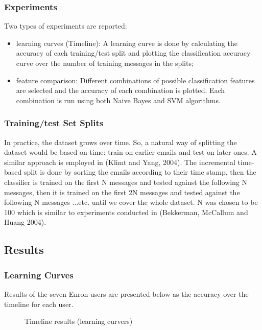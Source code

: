 \subsubsection{Experiments}
Two types of experiments are reported:

\begin{itemize}
  \item learning curves (Timeline): A learning curve is done by calculating the 
  accuracy of each training/test split and plotting the classification accuracy 
  curve over the number of training messages in the splits;

  \item feature comparison: Different combinations of possible classification 
  features are selected and the accuracy of each combination is plotted. 
  Each combination is run using both Naive Bayes and SVM algorithms.
  \end{itemize}

\subsubsection{Training/test Set Splits}
In practice, the dataset grows over time. So, a natural way of splitting the 
dataset would be based on time: train on earlier emails and test on later 
ones. A similar approach is employed in (Klimt and Yang, 2004)\cite{KY04}. 
The incremental time-based split is done by sorting the emails according to 
their time stamp, then the classifier is trained on the first N messages and 
tested against the following N messages, then it is trained on the first 2N 
messages and tested against the following N messages ...etc. until we cover 
the whole dataset. N was chosen to be 100 which is similar to experiments 
conducted in (Bekkerman, McCallum and Huang 2004)\cite{RON04}.

\subsection{Results}

\subsubsection{Learning Curves}
Results of the seven Enron users are presented below as the accuracy over 
the timeline for each user.

\begin{figure}[H]
    \begin{center}
    \end{center}
    \caption{Timeline results (learning curvers)}
\end{figure}

